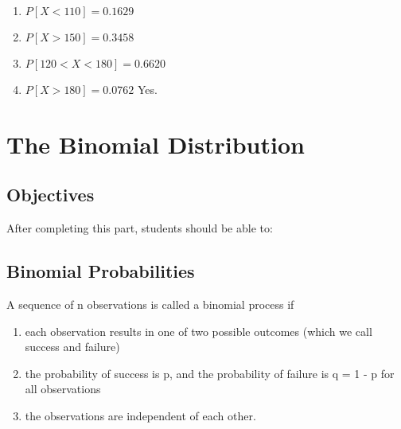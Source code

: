 \documentclass[11pt]{book}\usepackage[]{graphicx}\usepackage[]{color}
\begin{document}
\begin{exercises}
\begin{exercise}
\end{exercise}
\begin{solution}  %

\begin{enumerate}
\item $P[ X < 110 ] = 0.1629 $
\item $P[ X > 150 ] = 0.3458 $
\item $P[ 120 < X < 180 ] = 0.6620 $
\item $P[ X > 180 ] = 0.0762 $ Yes.
\end{enumerate}

\end{solution}
	

\end{exercises}

 \onecolumn




\chapter{The Binomial Distribution}
\label{chap:ch7}

\section{Objectives}

After completing this part, students should be able to:


\section{Binomial Probabilities}

A sequence of n observations is called a binomial process if

\begin{enumerate}
\item each observation results in one of two possible outcomes (which we call    success and failure)
\item the probability of success is p, and the probability of failure is q = 1 - p for all observations
\item the observations are independent of each other.
\end{enumerate}
\end{document}
